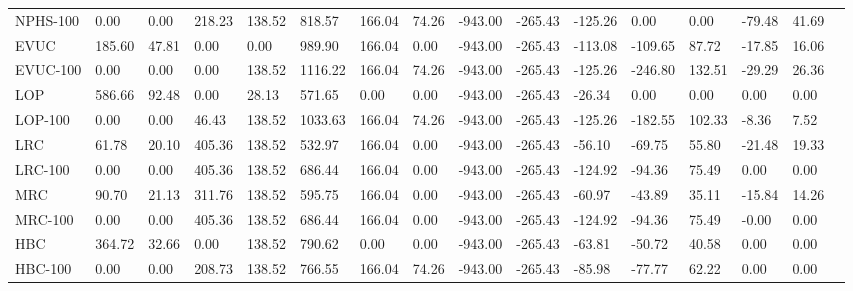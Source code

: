 \begin{table}
\begin{tabular}{lp{1.3cm}p{1.3cm}p{1.3cm}p{1.3cm}p{1.3cm}p{1.3cm}p{1.3cm}p{1.3cm}p{1.3cm}p{1.3cm}p{1.3cm}p{1.3cm}p{1.3cm}p{1.3cm}p{1.3cm}}
NPHS-100 &      0.00 &      0.00 &                218.23 &            138.52 &        818.57 &      166.04 &       74.26 &  -943.00 &    -265.43 & -125.26 &     0.00 &   0.00 &       -79.48 &    41.69 \\
EVUC     &    185.60 &     47.81 &                  0.00 &              0.00 &        989.90 &      166.04 &        0.00 &  -943.00 &    -265.43 & -113.08 &  -109.65 &  87.72 &       -17.85 &    16.06 \\
EVUC-100 &      0.00 &      0.00 &                  0.00 &            138.52 &       1116.22 &      166.04 &       74.26 &  -943.00 &    -265.43 & -125.26 &  -246.80 & 132.51 &       -29.29 &    26.36 \\
LOP      &    586.66 &     92.48 &                  0.00 &             28.13 &        571.65 &        0.00 &        0.00 &  -943.00 &    -265.43 &  -26.34 &     0.00 &   0.00 &         0.00 &     0.00 \\
LOP-100  &      0.00 &      0.00 &                 46.43 &            138.52 &       1033.63 &      166.04 &       74.26 &  -943.00 &    -265.43 & -125.26 &  -182.55 & 102.33 &        -8.36 &     7.52 \\
LRC      &     61.78 &     20.10 &                405.36 &            138.52 &        532.97 &      166.04 &        0.00 &  -943.00 &    -265.43 &  -56.10 &   -69.75 &  55.80 &       -21.48 &    19.33 \\
LRC-100  &      0.00 &      0.00 &                405.36 &            138.52 &        686.44 &      166.04 &        0.00 &  -943.00 &    -265.43 & -124.92 &   -94.36 &  75.49 &         0.00 &     0.00 \\
MRC      &     90.70 &     21.13 &                311.76 &            138.52 &        595.75 &      166.04 &        0.00 &  -943.00 &    -265.43 &  -60.97 &   -43.89 &  35.11 &       -15.84 &    14.26 \\
MRC-100  &      0.00 &      0.00 &                405.36 &            138.52 &        686.44 &      166.04 &        0.00 &  -943.00 &    -265.43 & -124.92 &   -94.36 &  75.49 &        -0.00 &     0.00 \\
HBC      &    364.72 &     32.66 &                  0.00 &            138.52 &        790.62 &        0.00 &        0.00 &  -943.00 &    -265.43 &  -63.81 &   -50.72 &  40.58 &         0.00 &     0.00 \\
HBC-100  &      0.00 &      0.00 &                208.73 &            138.52 &        766.55 &      166.04 &       74.26 &  -943.00 &    -265.43 &  -85.98 &   -77.77 &  62.22 &         0.00 &     0.00 \\
\bottomrule
\end{tabular}
\end{table}
